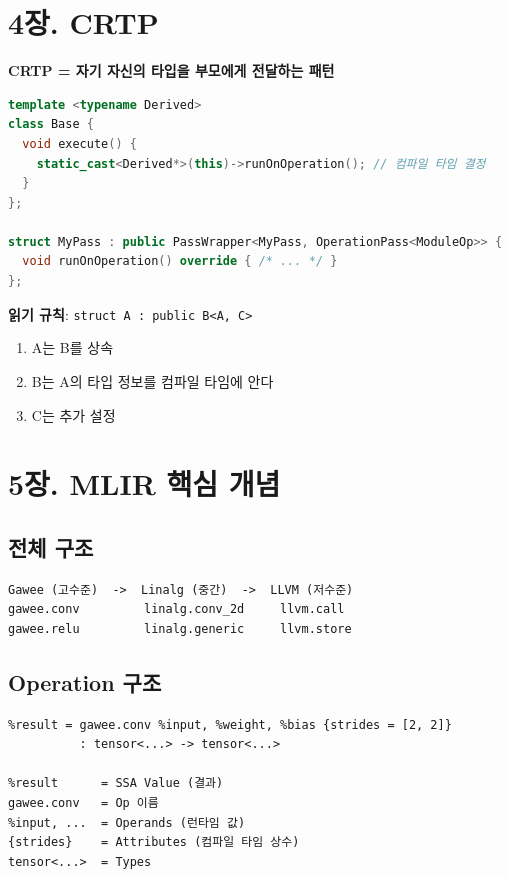 \documentclass[11pt,a4paper]{article}
\begin{document}
\newpage

\section{4장. CRTP}

\textbf{CRTP = 자기 자신의 타입을 부모에게 전달하는 패턴}

\begin{lstlisting}[language=C++]
template <typename Derived>
class Base {
  void execute() {
    static_cast<Derived*>(this)->runOnOperation(); // 컴파일 타임 결정
  }
};

struct MyPass : public PassWrapper<MyPass, OperationPass<ModuleOp>> {
  void runOnOperation() override { /* ... */ }
};
\end{lstlisting}

\textbf{읽기 규칙}: \texttt{struct A : public B<A, C>}
\begin{enumerate}[nosep]
\item A는 B를 상속
\item B는 A의 타입 정보를 컴파일 타임에 안다
\item C는 추가 설정
\end{enumerate}

\newpage

\section{5장. MLIR 핵심 개념}

\subsection{전체 구조}
\begin{lstlisting}
Gawee (고수준)  ->  Linalg (중간)  ->  LLVM (저수준)
gawee.conv         linalg.conv_2d     llvm.call
gawee.relu         linalg.generic     llvm.store
\end{lstlisting}

\subsection{Operation 구조}
\begin{lstlisting}
%result = gawee.conv %input, %weight, %bias {strides = [2, 2]}
          : tensor<...> -> tensor<...>

%result      = SSA Value (결과)
gawee.conv   = Op 이름
%input, ...  = Operands (런타임 값)
{strides}    = Attributes (컴파일 타임 상수)
tensor<...>  = Types
\end{lstlisting}
\end{document}
